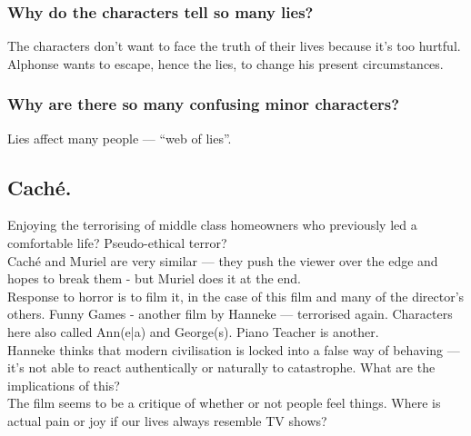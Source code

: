 \documentclass[12pt]{article}
\begin{document}
\subsubsection*{Why do the characters tell so many lies?}

The characters don't want to face the truth of their lives because
it's too hurtful. Alphonse wants to escape, hence the lies, to change
his present circumstances.

\subsubsection*{Why are there so many confusing minor characters?}

Lies affect many people --- ``web of lies''.

\subsection*{Caché.}

Enjoying the terrorising of middle class homeowners who previously led
a comfortable life? Pseudo-ethical terror?\\

Caché and Muriel are very similar --- they push the viewer over the edge
and hopes to break them - but Muriel does it at the end.\\

Response to horror is to film it, in the case of this film and many of
the director's others. Funny Games - another film by Hanneke ---
terrorised again. Characters here also called Ann(e|a) and George(s).
Piano Teacher is another.\\

Hanneke thinks that modern civilisation is locked into a false way of
behaving --- it's not able to react authentically or naturally to
catastrophe. What are the implications of this?\\

The film seems to be a critique of whether or not people feel things.
Where is actual pain or joy if our lives always resemble TV shows?
\end{document}
